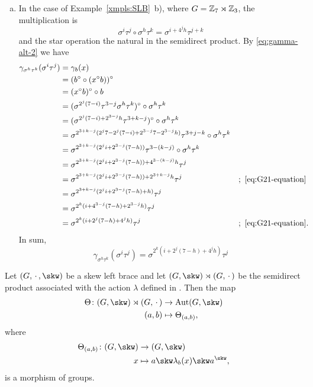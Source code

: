 \begin{xmpls}
\begin{enumerate}[a),font=\upshape]
        \item In the case of Example~\ref{xmpls:SLB}~b), where $G=\mathbb{Z}_7\rtimes\mathbb{Z}_3$, the multiplication is
        $$
            \sigma^i\tau^j\circ\sigma^h\tau^k=\sigma^{i+4^jh}\tau^{j+k}
        $$
        and the star operation the natural in the semidirect product. By \eqref{eq:gamma-alt-2} we have
        \begin{align*}
        \gamma_{\sigma^h\tau^k}(\sigma^i\tau^j)
            &= \gamma_b(x)\\
            &= (b^\circ\circ(x^\circ b))^\circ\\
            &= (x^\circ b)^\circ\circ b\\
            &= (\sigma^{2^j(7-i)}\tau^{3-j}\sigma^h\tau^k)^\circ
                \circ\sigma^h\tau^k\\
            &= (\sigma^{2^j(7-i)+2^{3-j}h}\tau^{3+k-j})^\circ
                \circ\sigma^h\tau^k\\
            &= \sigma^{2^{3+k-j}(2^j7-2^j(7-i)+ 2^{3-j}7-2^{3-j}h)}
                \tau^{3+j-k}\circ\sigma^h\tau^k\\
            &= \sigma^{2^{3+k-j}(2^ji+2^{3-j}(7-h))}
                \tau^{3-(k-j)}\circ\sigma^h\tau^k\\
            &= \sigma^{2^{3+k-j}(2^ji+2^{3-j}(7-h))+4^{3-(k-j)}h}\tau^j\\
            &= \sigma^{2^{3+k-j}(2^ji+2^{3-j}(7-h))+2^{3+k-j}h}\tau^j
                &&;\ \eqref{eq:G21-equation}\\
            &= \sigma^{2^{3+k-j}(2^ji+2^{3-j}(7-h)+h)}\tau^j\\
            &= \sigma^{2^k(i+4^{3-j}(7-h)+2^{3-j}h)}\tau^j\\
            &= \sigma^{2^k(i+2^j(7-h)+4^jh)}\tau^j
                &&;\ \eqref{eq:G21-equation}.
    \end{align*}
    In sum,
    \begin{equation}\label{eq:gamma-21}
        \gamma_{\sigma^h\tau^k}(\sigma^i\tau^j)
            = \sigma^{2^k(i+2^j(7-h)+4^jh)}\tau^j
    \end{equation}
\end{enumerate}
\end{xmpls}

\begin{lem}\label{lem:ybe-theta}
    Let\/ $(G,\,\cdot\,,\skw)$ be a skew left brace and let\/ $(G,\skw)\rtimes(G,\,\cdot\,)$ be the semidirect product associated with the action\/ $\lambda$ defined in . Then the map
    \begin{align*}
        \Theta\colon(G,\skw)\rtimes(G,\,\cdot\,)&\to\Aut(G,\skw)\\
        (a,b)&\mapsto\Theta_{(a,b)},
    \end{align*}
    where
    \begin{align*}
        \Theta_{(a,b)}\colon(G,\skw)&\to(G,\skw)\\
        x&\mapsto a\skw\lambda_b(x)\skw a^\skw,
    \end{align*}
    is a morphism of groups.
\end{lem}

